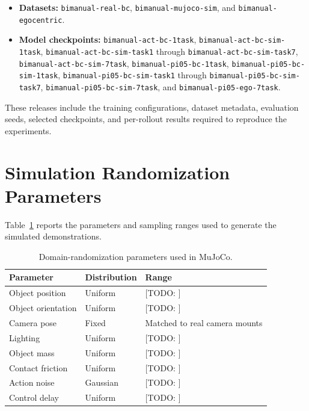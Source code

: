 \documentclass[10pt,conference]{IEEEtran}
\newcommand{\TODO}[1]{\textcolor{red!70!black}{[TODO: #1]}}
\begin{document}
\begin{itemize}[leftmargin=*]
    \item \textbf{Datasets:}
    \texttt{bimanual-real-bc},
    \texttt{bimanual-mujoco-sim}, and
    \texttt{bimanual-egocentric}.

    \item \textbf{Model checkpoints:}
    \texttt{bimanual-act-bc-1task},
    \texttt{bimanual-act-bc-sim-1task},
    \texttt{bimanual-act-bc-sim-task1} through
    \texttt{bimanual-act-bc-sim-task7},
    \texttt{bimanual-act-bc-sim-7task},
    \texttt{bimanual-pi05-bc-1task},
    \texttt{bimanual-pi05-bc-sim-1task},
    \texttt{bimanual-pi05-bc-sim-task1} through
    \texttt{bimanual-pi05-bc-sim-task7},
    \texttt{bimanual-pi05-bc-sim-7task}, and
    \texttt{bimanual-pi05-ego-7task}.
\end{itemize}

These releases include the training configurations, dataset metadata,
evaluation seeds, selected checkpoints, and per-rollout results required to
reproduce the experiments.

\appendix

\section{Simulation Randomization Parameters}
\label{app:sim-randomization}

Table~\ref{tab:sim-randomization} reports the parameters and sampling ranges
used to generate the simulated demonstrations.

\begin{table}[h]
\centering
\small
\caption{Domain-randomization parameters used in MuJoCo.}
\label{tab:sim-randomization}
\begin{tabular}{@{}lll@{}}
\toprule
Parameter & Distribution & Range \\
\midrule
Object position     & Uniform & \TODO{} \\
Object orientation  & Uniform & \TODO{} \\
Camera pose         & Fixed & Matched to real camera mounts \\
Lighting            & Uniform & \TODO{} \\
Object mass         & Uniform & \TODO{} \\
Contact friction    & Uniform & \TODO{} \\
Action noise        & Gaussian & \TODO{} \\
Control delay       & Uniform & \TODO{} \\
\bottomrule
\end{tabular}
\end{table}
\end{document}
